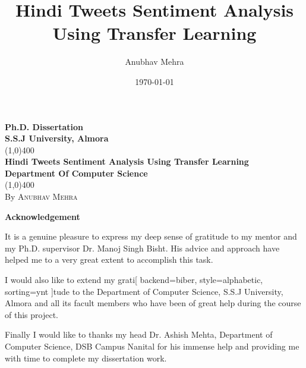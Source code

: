 \documentclass[12pt]{article}
\title{Hindi Tweets Sentiment Analysis Using Transfer Learning}
\author{Anubhav Mehra}
\date{\today}
\begin{document}
\begin{titlepage}
	\begin{center}
		\vspace*{1cm}
			\Huge{\textbf{Ph.D. Dissertation}}\\
			\Huge{\textbf{S.S.J University, Almora}}\\
			\vfill
			\line(1,0){400}\\[1mm]
			\large{\textbf{Hindi Tweets Sentiment Analysis Using Transfer Learning}}\\[3mm]
			\large{\textbf{Department Of Computer Science}}\\[1mm]
			\line(1,0){400}\\[1mm]
			By \textsc{Anubhav Mehra}
			
	\end{center}
\end{titlepage}
\begin{center}
\textbf{Acknowledgement}
\end{center}
It is a genuine pleasure to express my deep sense of gratitude to my mentor and my Ph.D. supervisor Dr. Manoj Singh Bisht. His advice and approach have helped me to a very great extent to accomplish this task. 

I would also like to extend my grati[
backend=biber,
style=alphabetic,
sorting=ynt
]tude to the Department of Computer Science, S.S.J University, Almora and all its facult members who have been of great help during the course of this project.

Finally I would like to thanks my head Dr. Ashish Mehta, Department of Computer Science, DSB Campus Nanital for his immense help and providing me with time to complete my dissertation work.
\thispagestyle{empty}
\clearpage

\tableofcontents
\thispagestyle{empty}
\clearpage
\setcounter{page}{1}
\end{document}
